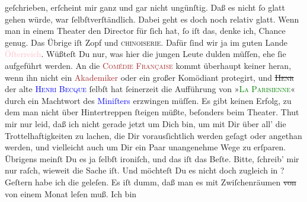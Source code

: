 \documentclass[twoside=false,titlepage=false,open=any, parskip=never, fontsize=12pt, headings=small, chapterprefix=false, appendixprefix=false]{scrbook}
\newcommand{\strikeout}[1]{\sout{#1}}
\newcommand{\pbposition}{\depth}
\newcommand{\pb}{\nobreak\hspace{0pt}\raisebox{-0.1em}{\raisebox{\pbposition}{\textnormal{|}}}\nobreak\hspace{0pt}}
\begin{document}
               geſchrieben, erſcheint mir ganz und gar nicht ungünſtig. Daß es nicht ſo glatt gehen
               würde, war ſelbſtverſtändlich. Dabei geht es doch noch relativ glatt. Wenn man in
               einem Theater den Director für ſich hat, ſo iſt das, denke ich, Chance genug. Das {\pb}Übrige iſt Zopf und \textsc{chinoiserie}. Dafür ſind wir ja im guten Lande \textcolor{pink}{Öſterreich}{}\ledrightnote{\textcolor{pink}{Österreich}}. Wüßteſt Du nur, was hier die jungen Leute dulden müſſen, ehe ſie
               aufgeführt werden. An die \textsc{\textcolor{brown}{Comédie
                     Française}{}\ledrightnote{\textcolor{brown}{Comédie-Française}}} kommt überhaupt keiner heran, wenn ihn nicht ein \textcolor{brown}{Akademiker}{} oder ein großer
               Komödiant protegirt, und \strikeout{\textsc{Henr}} der alte \textsc{\textcolor{blue}{Henri Becque}{}\ledrightnote{\textcolor{blue}{Henri Becque}}} ſelbſt hat ſeinerzeit die Aufführung von »\textsc{\textcolor{green}{La Parisienne}{}\ledrightnote{\textcolor{green}{La Parisienne}}}« durch ein
               Machtwort des \textcolor{blue}{Miniſters}{}
               erzwingen müſſen. Es gibt keinen Erfolg, zu dem man nicht über Hintertreppen ſteigen
               müßte, beſonders beim Theater. Thut mir nur leid, daß ich nicht gerade jetzt um Dich
               bin, um {\pb}mit Dir über all’ die Trottelhaftigkeiten
               zu lachen, die Dir vorausſichtlich werden geſagt oder angethan werden, und vielleicht
               auch um Dir ein Paar unangenehme Wege zu erſparen. Übrigens meinſt Du es ja ſelbſt
               ironiſch, und das iſt das Beſte. Bitte, ſchreib’ mir nur raſch, wieweit die Sache
               iſt. Und möchteſt Du es nicht doch zugleich in \label{K_L02620-3v}\label{K_L02620-3h}?\pend
           \pstart
           Geſtern habe ich die \label{K_L02620-2v}\label{K_L02620-2h} geleſen. Es iſt dumm, daß man es mit
               Zwiſchenräumen \strikeout{von} von einem Monat leſen muß. Ich bin
\end{document}
